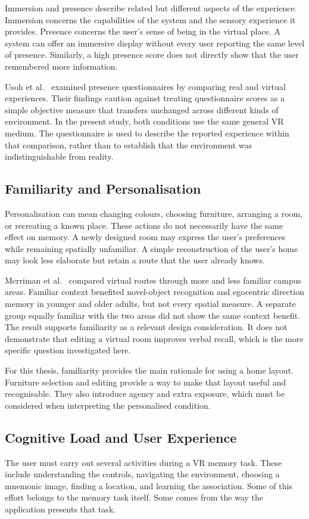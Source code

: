 Immersion and presence describe related but different aspects of the experience. Immersion concerns the capabilities of the system and the sensory experience it provides. Presence concerns the user's sense of being in the virtual place. A system can offer an immersive display without every user reporting the same level of presence. Similarly, a high presence score does not directly show that the user remembered more information.

Usoh et al.~\cite{usoh2000} examined presence questionnaires by comparing real and virtual experiences. Their findings caution against treating questionnaire scores as a simple objective measure that transfers unchanged across different kinds of environment. In the present study, both conditions use the same general VR medium. The questionnaire is used to describe the reported experience within that comparison, rather than to establish that the environment was indistinguishable from reality.

\subsection{Familiarity and Personalisation}
Personalisation can mean changing colours, choosing furniture, arranging a room, or recreating a known place. These actions do not necessarily have the same effect on memory. A newly designed room may express the user's preferences while remaining spatially unfamiliar. A simple reconstruction of the user's home may look less elaborate but retain a route that the user already knows.

Merriman et al.~\cite{merriman2016} compared virtual routes through more and less familiar campus areas. Familiar context benefited novel-object recognition and egocentric direction memory in younger and older adults, but not every spatial measure. A separate group equally familiar with the two areas did not show the same context benefit. The result supports familiarity as a relevant design consideration. It does not demonstrate that editing a virtual room improves verbal recall, which is the more specific question investigated here.

For this thesis, familiarity provides the main rationale for using a home layout. Furniture selection and editing provide a way to make that layout useful and recognisable. They also introduce agency and extra exposure, which must be considered when interpreting the personalised condition.

\subsection{Cognitive Load and User Experience}
The user must carry out several activities during a VR memory task. These include understanding the controls, navigating the environment, choosing a mnemonic image, finding a location, and learning the association. Some of this effort belongs to the memory task itself. Some comes from the way the application presents that task.

